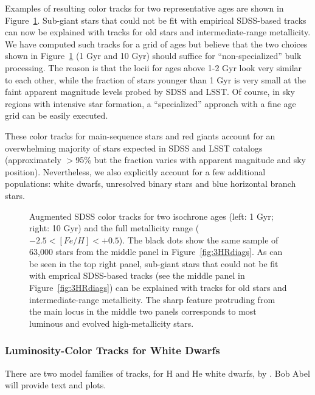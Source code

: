 Examples of resulting color tracks for two representative ages are shown in Figure~\ref{fig:augmLocus}. Sub-giant stars that could not
be fit with empirical SDSS-based tracks can now be explained with tracks for old stars and intermediate-range metallicity. 
We have computed such tracks for a grid of ages but believe that the two choices shown in Figure~\ref{fig:augmLocus}
(1 Gyr and 10 Gyr) should suffice for ``non-specialized'' bulk processing. The reason is that the locii for ages above 1-2 Gyr look
very similar to each other, while the fraction of stars younger than 1 Gyr is very small at the faint apparent magnitude
levels probed by SDSS and LSST. Of course, in sky regions with intensive star formation, a ``specialized'' approach with
a fine age grid can be easily executed. 

These color tracks for main-sequence stars and red giants account for an overwhelming majority of stars 
expected in SDSS and LSST catalogs (approximately $>$95\% but the fraction varies with apparent magnitude and sky position). 
Nevertheless, we also explicitly account for a few additional populations: white dwarfs, unresolved binary stars and
blue horizontal branch stars. 



\begin{figure}[b!]
\caption{Augmented SDSS color tracks for two isochrone ages (left: 1 Gyr; right: 10 Gyr) and the full metallicity range
  ($-2.5 < [Fe/H] < +0.5$). The black dots show the same sample of 63,000 stars from the middle panel in
  Figure~\ref{fig:3HRdiags}. As can be seen in the top right panel, sub-giant stars that could not be fit with emprical
  SDSS-based tracks (see the middle panel in Figure~\ref{fig:3HRdiags}) can be explained with tracks for old stars and
  intermediate-range metallicity. The sharp feature protruding from the main locus in the middle two panels corresponds
  to most luminous and evolved high-metallicity stars. 
}
\label{fig:augmLocus}
\end{figure}


\subsubsection{Luminosity-Color Tracks for White Dwarfs}

There are two model families of tracks, for H and He white dwarfs, by \cite{1995PASP..107.1047B}.
Bob Abel will provide text and plots.

